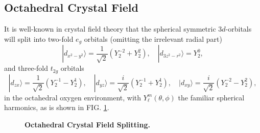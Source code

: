 \documentclass[10pt,nofootinbib,letterpaper]{revtex4}
\begin{document}
	\subsection{Octahedral Crystal Field}
		It is well-known in crystal field theory \cite{fazekas1999lecture} that the spherical symmetric $3d$-orbitals will split into two-fold $e_g$ orbitals (omitting the irrelevant radial part)
		\begin{equation*}
			|d_{x^2-y^2}\rangle=\dfrac{1}{\sqrt 2}(Y_2^{-2}+Y_2^2),\quad|d_{3z^2-r^2}\rangle=Y^0_2,
		\end{equation*}
		and three-fold $t_{2g}$ orbitals
		\begin{equation*}
			|d_{zx}\rangle=\dfrac{1}{\sqrt 2}(Y_2^{-1}-Y^1_2),\quad|d_{yz}\rangle=\dfrac{i}{\sqrt 2}(Y_2^{-1}+Y^1_2),\quad|d_{xy}\rangle=\dfrac{i}{\sqrt 2}(Y_2^{-2}-Y^2_2),
		\end{equation*}
		in the octahedral oxygen environment, with $Y_\ell^m(\theta,\phi)$ the familiar spherical harmonics, as is shown in FIG. \ref{fig:t2g-eg}.\par
		\begin{figure}[!htp]
			\centering
			\caption{\bf Octahedral Crystal Field Splitting.}
			\label{fig:t2g-eg}
		\end{figure}
		
\end{document}
